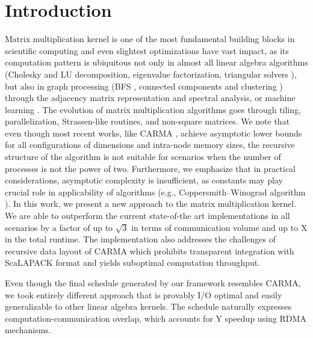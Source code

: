 \documentclass[sigconf]{acmart}
\begin{document}
	
	
	\section{Introduction}
	Matrix multiplication kernel is one of the most fundamental building blocks 
	in scientific computing and even slightest optimizations have vast impact, 
	as its 
	computation pattern is ubiquitous not only in almost all linear algebra 
	algorithms (Cholesky and LU decomposition, eigenvalue factorization, 
	triangular solvers \cite{linearAlgebraLAPACK}), but also in graph 
	processing (BFS \cite{slimsell}, connected components and clustering 
	\cite{Cheeger}) through the adjacency matrix representation and spectral 
	analysis, or machine learning \cite{tensorflow}. The 
	evolution of matrix multiplication algorithms goes through tiling, 
	parallelization, Strassen-like routines, and non-square matrices. We note 
	that even though most recent works, like CARMA \cite{CARMA}, achieve 
	asymptotic 
	lower bounds for all configurations of dimensions and intra-node memory 
	sizes, the recursive structure of the algorithm is not suitable for 
	scenarios when the number of processes is not the power of two. 
	Furthermore, we emphasize that in practical considerations, asymptotic 
	complexity is insufficient, as constants may play crucial role in 
	applicability of algorithms (e.g., Coppersmith–Winograd algorithm 
	\cite{coppersmith}).
	In this work, we present a new approach to the matrix multiplication 
	kernel. We are able to outperform the current state-of-the art 
	implementations in all scenarios by a factor of up to $\sqrt{3}$ in terms 
	of communication volume and up to X in the total runtime. The 
	implementation 
	also addresses the challenges of recursive data layout of CARMA which 
	prohibits transparent integration with ScaLAPACK format and yields 
	suboptimal computation throughput.
	
	Even though the final schedule generated by our framework resembles CARMA, 
	we took entirely different approach that is provably I/O optimal and easily 
	generalizable to other linear algebra kernels. The schedule naturally 
	expresses computation-communication overlap, which accounts for Y speedup 
	using RDMA mechanisms.
	
\end{document}

